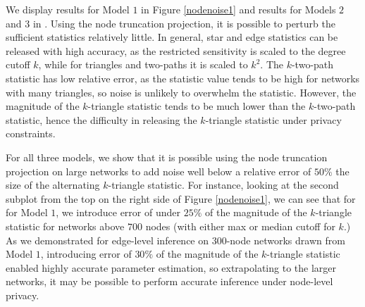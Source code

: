 We display results for Model $1$ in Figure \ref{nodenoise1} and results for Models $2$ and $3$ in . Using the node truncation projection, it is possible to perturb the sufficient statistics relatively little.  In general, star and edge statistics can be released with high accuracy, as the restricted sensitivity is scaled to the degree cutoff $k$, while for triangles and two-paths it is scaled to $k^2$. The $k$-two-path statistic has low relative error, as the statistic value tends to be high for networks with many triangles, so noise is unlikely to overwhelm the statistic. However, the magnitude of the $k$-triangle statistic tends to be much lower than the $k$-two-path statistic, hence the difficulty in releasing the $k$-triangle statistic under privacy constraints. 

For all three models, we show that it is possible using the node truncation projection on large networks to add noise well below a relative error of $50\%$ the size of the alternating $k$-triangle statistic.  For instance, looking at the second subplot from the top on the right side of Figure \ref{nodenoise1}, we can see that for for Model $1$, we introduce error of under $25\%$ of the magnitude of the $k$-triangle statistic for networks above $700$ nodes (with either max or median cutoff for $k$.) As we demonstrated for edge-level inference on $300$-node networks drawn from Model $1$, introducing error of $30\%$ of the magnitude of the $k$-triangle statistic enabled highly accurate parameter estimation, so extrapolating to the larger networks, it may be possible to perform accurate inference under node-level privacy.

